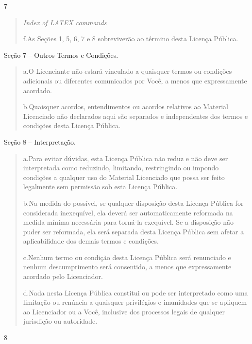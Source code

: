 \documentclass[
]{article}
\begin{document}
7

\begin{quote}
\emph{Index of LATEX commands}

f.As Seções 1, 5, 6, 7 e 8 sobreviverão ao término desta Licença
Pública.
\end{quote}

Seção 7 -- Outros Termos e Condições.

\begin{quote}
a.O Licenciante não estará vinculado a quaisquer termos ou condições
adicionais ou diferentes comunicados por Você, a menos que expressamente
acordado.

b.Quaisquer acordos, entendimentos ou acordos relativos ao Material
Licenciado não declarados aqui são separados e independentes dos termos
e condições desta Licença Pública.
\end{quote}

Seção 8 -- Interpretação.

\begin{quote}
a.Para evitar dúvidas, esta Licença Pública não reduz e não deve ser
interpretada como reduzindo, limitando, restringindo ou impondo
condições a qualquer uso do Material Licenciado que possa ser feito
legalmente sem permissão sob esta Licença Pública.

b.Na medida do possível, se qualquer disposição desta Licença Pública
for considerada inexequível, ela deverá ser automaticamente reformada na
medida mínima necessária para torná-la exequível. Se a disposição não
puder ser reformada, ela será separada desta Licença Pública sem afetar
a aplicabilidade dos demais termos e condições.

c.Nenhum termo ou condição desta Licença Pública será renunciado e
nenhum descumprimento será consentido, a menos que expressamente
acordado pelo Licenciador.

d.Nada nesta Licença Pública constitui ou pode ser interpretado como uma
limitação ou renúncia a quaisquer privilégios e imunidades que se
apliquem ao Licenciador ou a Você, inclusive dos processos legais de
qualquer jurisdição ou autoridade.
\end{quote}

8
\end{document}
